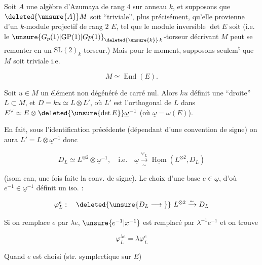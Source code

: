 Soit $A$ une algèbre d'Azumaya de rang $4$ sur anneau $k$, et supposons que $\deleted{\unsure{A}}M$ soit ``triviale'', plus précisément, qu'elle provienne d'un $k$-module projectif de rang $2$ $E$, tel que le module inversible $\det E$ soit  (i.e. le  $\unsure{G_p(1)|\mathrm{GP}(1)|Gp(1)}_{\deleted{\unsure{k}}\,k}$-torseur décrivant $M$ peut se remonter en un $\mathrm{SL}(2)_k$-torseur.) Mais pour le moment, supposons seulem\textsuperscript{t} que $M$ soit triviale i.e.

\[
 M\simeq\operatorname{End}(E).
\]

Soit $u\in M$ un élément non dégénéré de carré nul. Alors $ku$ définit une ``droite'' $L\subset M$, et $D=ku\simeq L\otimes L'$, où $L'$ est l'orthogonal de $L$ dans $E^\vee\simeq E\otimes\deleted{\unsure{\det E}}\underline{\omega}^{-1}$ (où $\underline{\omega}=\omega(E)$).

 En fait, sous l'identification précédente (dépendant d'une convention de signe) on aura $L'=L\otimes\underline{\omega}^{-1}$ donc

\[
 D_L\simeq L^{\otimes2}\otimes\underline{\omega}^{-1},\quad
 \text{i.e.}\quad\underline{\omega}\xrightarrow[\sim]{\varphi_L}
 \underline{\operatorname{Hom}}(L^{\otimes2},D_L)
\]

(isom can,  une fois faite la conv. de signe). Le choix d'une base $e\in\underline{\omega}$, d'où $e^{-1}\in\underline{\omega}^{-1}$ définit un iso. :

\[
 \varphi_L^e:\quad\deleted{\unsure{D_L\longrightarrow{}}}\ L^{\otimes2}\xrightarrow{\sim} D_L
\]

Si on remplace $e$ par $\lambda e$, $\unsure{e^{-1}|x^{-1}}$ est remplacé par $\lambda^{-1}e^{-1}$ et on trouve

\[
 \varphi_L^{\lambda e}=\lambda\varphi_L^e
\]

Quand $e$ est choisi (str. symplectique sur $E$)

